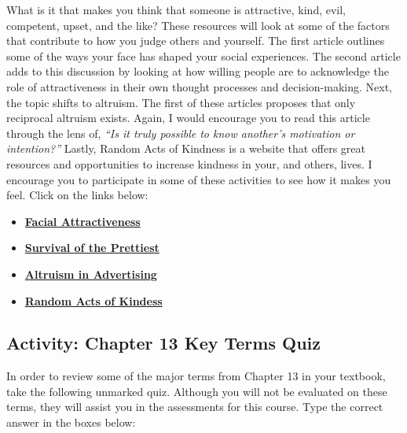 \documentclass[
]{book}
\providecommand{\tightlist}{%
  \setlength{\itemsep}{0pt}\setlength{\parskip}{0pt}}
\begin{document}
\begin{reflect}
What is it that makes you think that someone is attractive, kind, evil, competent, upset, and the like? These resources will look at some of the factors that contribute to how you judge others and yourself. The first article outlines some of the ways your face has shaped your social experiences. The second article adds to this discussion by looking at how willing people are to acknowledge the role of attractiveness in their own thought processes and decision-making. Next, the topic shifts to altruism. The first of these articles proposes that only reciprocal altruism exists. Again, I would encourage you to read this article through the lens of, \emph{``Is it truly possible to know another's motivation or intention?''} Lastly, Random Acts of Kindness is a website that offers great resources and opportunities to increase kindness in your, and others, lives. I encourage you to participate in some of these activities to see how it makes you feel. Click on the links below:

\begin{itemize}
\tightlist
\item
  \href{https://www.ncbi.nlm.nih.gov/pmc/articles/PMC3130383/}{\textbf{Facial Attractiveness}}\\
\item
  \href{https://www.macleans.ca/society/science/the-mysterious-power-of-attractive-people/}{\textbf{Survival of the Prettiest}}\\
\item
  \href{https://public.wsu.edu/~taflinge/altruism.html}{\textbf{Altruism in Advertising}}\\
\item
  \href{http://www.actsofkindness.org/}{\textbf{Random Acts of Kindess}}
\end{itemize}
\end{reflect}

\hypertarget{activity-chapter-13-key-terms-quiz}{%
\subsection*{Activity: Chapter 13 Key Terms Quiz}\label{activity-chapter-13-key-terms-quiz}}

\begin{reflect}
In order to review some of the major terms from Chapter 13 in your textbook, take the following unmarked quiz. Although you will not be evaluated on these terms, they will assist you in the assessments for this course. Type the correct answer in the boxes below:
\end{reflect}
\end{document}
